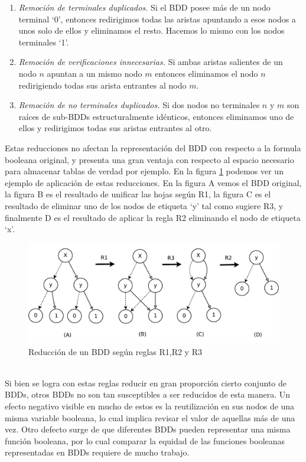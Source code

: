 \documentclass[titlepage, 12pt]{book}
\begin{document}
\begin{enumerate}[R1--]
\item \textit{Remoci\'on de terminales duplicados.} Si el BDD posee m\'as de un nodo terminal `0', entonces redirigimos todas las aristas apuntando a esos nodos a unos solo de ellos y eliminamos el resto. Hacemos lo mismo con los nodos terminales `1'.
\item \textit{Remoci\'on de verificaciones innecesarias.} Si ambas aristas salientes de un nodo $n$ apuntan a un mismo nodo $m$ entonces eliminamos el nodo $n$ redirigiendo todas sus arista entrantes al nodo $m$.
\item \textit{Remoci\'on de no terminales duplicados.} Si dos nodos no terminales $n$ y $m$ son ra\'ices de sub-BDDs estructuralmente id\'enticos, entonces eliminamos uno de ellos y redirigimos todas sus aristas entrantes al otro.
\end{enumerate}

Estas reducciones no afectan la representaci\'on del BDD con respecto a la formula booleana original, y presenta una gran ventaja con respecto al espacio necesario para almacenar tablas de verdad por ejemplo. En la figura \ref{reduccionBDD} podemos ver un ejemplo de aplicaci\'on de estas reducciones. En la figura A vemos el BDD original, la figura B es el resultado de unificar las hojas seg\'un R1, la figura C es el resultado de eliminar uno de los nodos de etiqueta `y' tal como sugiere R3, y finalmente D es el resultado de aplicar la regla R2 eliminando el nodo de etiqueta `x'.

\begin{figure}[htp]
  \centering
    \includegraphics[scale=0.75]{Imagenes/reduccionBDD.pdf}
  \caption{Reducci\'on de un BDD seg\'un reglas R1,R2 y R3}
  \label{reduccionBDD}
\end{figure}
~\\

Si bien se logra con estas reglas reducir en gran proporci\'on cierto conjunto de BDDs, otros BDDs no son tan susceptibles a ser reducidos de esta manera. Un efecto negativo visible en mucho de estos es la reutilizaci\'on en sus nodos de una misma variable booleana, lo cual implica revisar el valor de aquellas m\'as de una vez. Otro defecto surge de que diferentes BDDs pueden representar una misma funci\'on booleana, por lo cual comparar la equidad de las funciones booleanas representadas en BDDs requiere de mucho trabajo.\\
\end{document}
